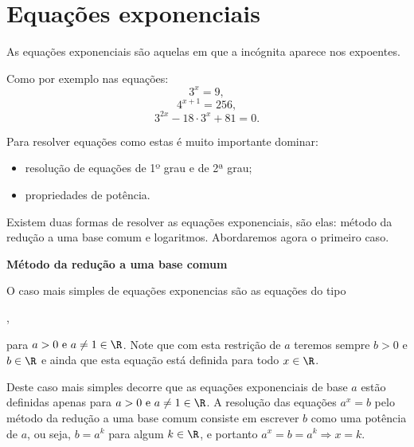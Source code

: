 \newpage
\section{Equações exponenciais}

  \vskip0.3cm
 \colorbox{azul}{
 \begin{minipage}{0.9\linewidth}
 \begin{center}
  As equações exponenciais são aquelas em que a incógnita aparece nos expoentes.
 \end{center}
 \end{minipage}}
 \vskip0.3cm

 Como por exemplo nas equações:
\begin{equation}
3^x= 9 ,
\end{equation}
\begin{equation}
4^{x+1}= 256 ,
\end{equation}
\begin{equation}
3^{2x}- 18\cdot 3^x + 81=0 .
\end{equation}

 Para resolver equações como estas é muito importante dominar:
 \begin{itemize}
  \item resolução de equações de 1º grau e de 2ª grau;
  \item propriedades de potência.
 \end{itemize}

 Existem duas formas de resolver as equações exponenciais, são elas: método da redução a uma base comum e logaritmos. Abordaremos agora o primeiro caso.

 \vskip0.3cm

 \textbf{Método da redução a uma base comum}

 \vskip0.3cm

 O caso mais simples de equações exponencias são as equações do tipo
 
 ,

 para $a > 0 \text{ e } a \neq 1 \in \R$. Note que com esta restrição de $a$ teremos sempre $b > 0$ e $b \in \R$ e ainda que esta equação está definida para todo $x \in \R$.

 Deste caso mais simples decorre que as equações exponenciais de base $a$ estão definidas apenas para $a > 0 \text{ e } a \neq 1 \in \R$. A resolução das equações $a^x= b$ pelo método da redução a uma base comum consiste em escrever $b$ como uma potência de $a$, ou seja, $b= a^k$  para algum $k \in \R$, e portanto $a^{x}= b= a^{k} \Rightarrow x= k$.

